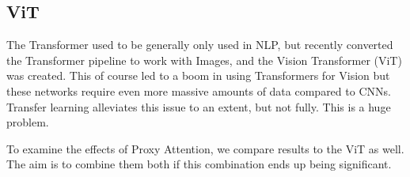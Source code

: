 \subsection*{ViT}
The Transformer used to be generally only used in NLP, but recently \cite{dosovitskiy2020image} converted the Transformer pipeline to work with Images, and the Vision Transformer (ViT) was created. This of course led to a boom in using Transformers for Vision but these networks require even more massive amounts of data compared to CNNs. Transfer learning alleviates this issue to an extent, but not fully. This is a huge problem.

To examine the effects of Proxy Attention, we compare results to the ViT as well. The aim is to combine them both if this combination ends up being significant.